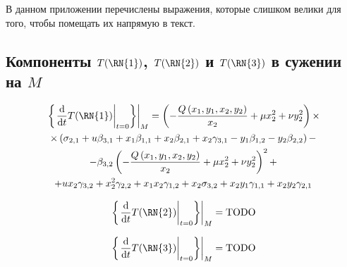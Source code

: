 \documentclass[../main.tex]{subfiles}
\begin{document}
\setcounter{equation}{0}
\renewcommand{\theequation}{П1.\arabic{equation}}
В данном приложении перечислены выражения, которые слишком велики для того, чтобы помещать их напрямую в текст.

\subsection{Компоненты $T(\mathrm{\RN{1}})$, $T(\mathrm{\RN{2}})$ и $T(\mathrm{\RN{3}})$ в сужении на $M$}
\begin{multline}\label{eq:appendix_t1}
\left.\left\{ \left.\frac{\mathrm d}{\mathrm{d}t}T(\mathrm{\RN{1}})\right|_{t = 0}\right\} \right|_M =
\left(-\frac{Q\left(x_1,y_1,x_2,y_2\right)}{x_2} + \mu x_2^2 + \nu y_2^2\right) \times \\
\times \left( \sigma_{2,1} + u \beta_{3,1} + x_1 \beta_{1,1} + x_2 \beta_{2,1} + x_2 \gamma_{3,1} - y_1 \beta_{1,2} - y_2 \beta_{2,2} \right) - \\ 
- \beta_{3,2} \left(-\frac{Q\left(x_1,y_1,x_2,y_2\right)}{x_2}+\mu  x_2^2+\nu y_2^2\right)^2 + \\
+ u x_2 \gamma_{3,2} + x_2^2 \gamma_{2,2} + x_1 x_2 \gamma_{1,2}+x_2 \sigma_{3,2}+x_2 y_1 \gamma_{1,1}+x_2 y_2 \gamma_{2,1}
\end{multline}

\begin{multline}\label{eq:appendix_t2}
\left.\left\{ \left.\frac{\mathrm d}{\mathrm{d}t}T(\mathrm{\RN{2}})\right|_{t = 0}\right\} \right|_M = \textrm{TODO}
\end{multline}

\begin{multline}\label{eq:appendix_t3}
\left.\left\{ \left.\frac{\mathrm d}{\mathrm{d}t}T(\mathrm{\RN{3}})\right|_{t = 0}\right\} \right|_M = \textrm{TODO}
\end{multline}
\end{document}

